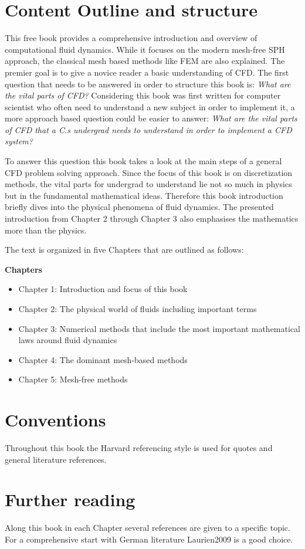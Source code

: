 \section{Content Outline and structure}

This free book provides a comprehensive introduction and overview of computational fluid dynamics. While it focuses on the modern mesh-free SPH approach, the classical mesh based methods like FEM are also explained. The premier goal is to give a novice reader a basic understanding of CFD. The first question that needs to be answered in order to structure this book is: \emph{What are the vital parts of CFD?} 
Considering this book was first written for computer scientist who often need to understand a new subject in order to implement it, a more approach based question
could be easier to answer: \emph{What are the vital parts of CFD that a C.s undergrad needs to understand in order to implement a CFD system?}

To answer this question this book takes a look at the main steps of a general CFD problem solving approach. Since the focus of this book is on discretization methods, the vital parts for undergrad to understand lie not so much in physics but in the fundamental mathematical ideas. Therefore this book introduction briefly dives into the physical phenomena of fluid dynamics. The presented introduction from Chapter 2 through Chapter 3 also emphasises the mathematics more than the physics.
 
The text is organized in five Chapters that are outlined as follows:

\textbf{Chapters} 
\begin{itemize}

\item Chapter 1: Introduction and focus of this book
\item Chapter 2: The physical world of fluids including important terms 
\item Chapter 3: Numerical methods that include the most important mathematical
laws around fluid dynamics
\item Chapter 4: The dominant mesh-based methods
\item Chapter 5: Mesh-free methods

\end{itemize}


\section{Conventions}

Throughout this book the Harvard referencing style is used for quotes and general literature references. 

\section{Further reading}
Along this book in each Chapter several references are given to a specific topic. For a comprehensive start with German literature Laurien2009 is a good choice.